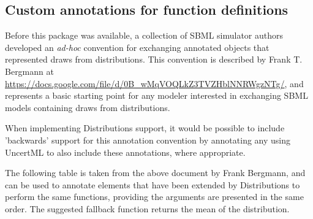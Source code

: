\documentclass[draftspec]{sbmlpkgspec}
\newcommand{\distrib}{Distributions\xspace}
\begin{document}
\begin{blockChanged}
\subsection{Custom annotations for function definitions}
Before this package was available, a collection of SBML simulator authors developed an \emph{ad-hoc} convention for exchanging annotated \FunctionDefinition objects that represented draws from distributions.  This convention is described by Frank T. Bergmann at \url{https://docs.google.com/file/d/0B_wMqVOQLkZ3TVZHblNNRWgzNTg/}, and represents a basic starting point for any modeler interested in exchanging SBML models containing draws from distributions.

When implementing \distrib support, it would be possible to include 'backwards' support for this annotation convention by annotating any \FunctionDefinition using UncertML to also include these annotations, where appropriate.

The following table is taken from the above document by Frank Bergmann, and can be used to annotate \FunctionDefinition elements that have been extended by \distrib to perform the same functions, providing the arguments are presented in the same order.  The suggested fallback function returns the mean of the distribution.


\end{blockChanged}
\end{document}
